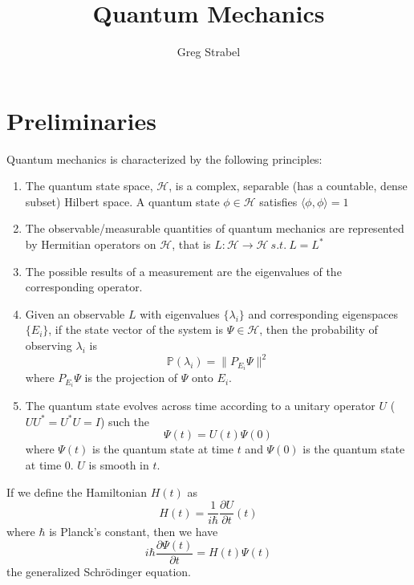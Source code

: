 \documentclass[11pt]{article}
\author{Greg Strabel}
\title{Quantum Mechanics}
\theoremstyle{definition}
\begin{document}
\maketitle
\section{Preliminaries}
Quantum mechanics is characterized by the following principles:
\begin{enumerate}
\item The quantum state space, $\mathcal{H}$, is a complex, separable (has a countable, dense subset) Hilbert space. A quantum state $\phi \in \mathcal{H}$ satisfies $\langle \phi , \phi \rangle = 1$
\item The observable/measurable quantities of quantum mechanics are represented by Hermitian operators on $\mathcal{H}$, that is $L: \mathcal{H} \rightarrow \mathcal{H} \ s.t. \ L = L^*$
\item The possible results of a measurement are the eigenvalues of the corresponding operator.
\item Given an observable $L$ with eigenvalues $\{\lambda_i\}$ and corresponding eigenspaces $\{E_i\}$, if the state vector of the system is $\Psi \in \mathcal{H}$, then the probability of observing $\lambda_i$ is
\begin{equation}
\mathbb{P}\left(\lambda_i\right)=\lVert P_{E_i} \Psi \rVert^2
\end{equation}
where $P_{E_i} \Psi$ is the projection of $\Psi$ onto $E_i$.
\item The quantum state evolves across time according to a unitary operator $U$ ($UU^* = U^*U = I$) such the
\begin{equation}
\Psi \left( t \right) = U\left(t\right) \Psi \left( 0 \right)
\end{equation}
where $\Psi \left( t \right)$ is the quantum state at time $t$ and $\Psi \left( 0 \right)$ is the quantum state at time 0. $U$ is smooth in $t$. 
\end{enumerate}
If we define the Hamiltonian $H\left(t\right)$ as
\begin{equation}
H \left( t \right) = \frac{1}{i \hbar} \frac{\partial U}{\partial t} \left( t \right)
\end{equation}
where $\hbar$ is Planck's constant, then we have
\begin{equation}
i \hbar \frac{\partial \Psi \left( t \right)}{\partial t} = H \left( t \right) \Psi \left( t \right)
\end{equation}
the generalized Schr\"{o}dinger equation.
\end{document}
